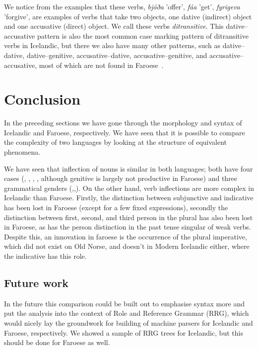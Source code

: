 \documentclass[12pt,%
    times,
]{lin-v2/lin}
\begin{document}
We notice from the examples that these verbs, \emph{bjóða} 'offer', \emph{fáa} 'get', \emph{fyrigeva} 'forgive', are
examples of verbs that take two objects, one dative (indirect) object and one accusative (direct) object. We call these verbs \emph{ditransitive}.
This dative--accusative pattern is also the most common case marking pattern of ditransitive verbs in Icelandic, but there
we also have many other patterns, such as dative--dative, dative--genitive, accusative--dative, accusative--genitive, and
accusative--accusative, most of which are not found in Faroese~\citep[262-263]{faroese}.


\section{Conclusion}

In the preceding sections we have gone through the morphology and syntax of Icelandic and Faroese, respectively.
We have seen that it is possible to compare the complexity of two languages by looking at the structure of
equivalent phenomena.

We have seen that inflection of nouns is similar in both languages; both have four cases (\Nom, \Acc, \Dat, \Gen{}, although genitive
is largely not productive in Faroese) and three grammatical genders (\M{},\F{},\N{}). On the other hand,
verb inflections are more complex in Icelandic than Faroese. Firstly, the distinction between subjunctive and
indicative has been lost in Faroese (except for a few fixed expressions), secondly the distinction
between first, second, and third person in the plural has also been lost in Faroese, as has the
person distinction in the past tense singular of weak verbs. Despite this, an innovation in faroese
is the occurrence of the plural imperative, which did not exist on Old Norse, and doesn't in Modern Icelandic either,
where the \Second\Pl{} indicative has this role.

\subsection{Future work}

In the future this comparison could be built out to emphasise syntax more and put the analysis
into the context of Role and Reference Grammar (RRG), which would nicely lay the groundwork for building of machine parsers
for Icelandic and Faroese, respectively. We showed a sample of RRG trees for Icelandic, but this
should be done for Faroese as well.
\\\\



    
    

\end{document}
